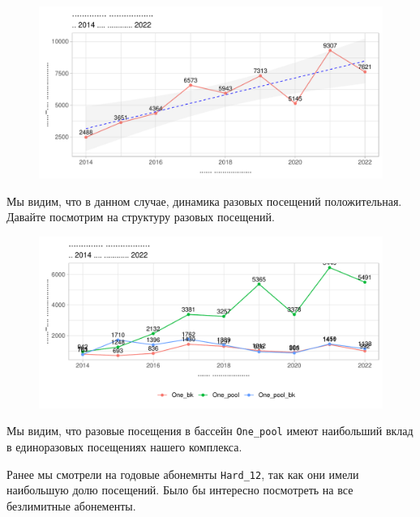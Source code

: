 \documentclass[
  letterpaper,
  DIV=11,
  numbers=noendperiod]{scrreprt}
\begin{document}
\begin{figure}

{\centering \includegraphics{./intro_files/figure-pdf/unnamed-chunk-12-1.pdf}

}

\end{figure}

Мы видим, что в данном случае, динамика разовых посещений положительная.
Давайте посмотрим на структуру разовых посещений.

\begin{figure}

{\centering \includegraphics{./intro_files/figure-pdf/unnamed-chunk-13-1.pdf}

}

\end{figure}

Мы видим, что разовые посещения в бассейн \texttt{One\_pool} имеют
наибольший вклад в единоразовых посещениях нашего комплекса.

Ранее мы смотрели на годовые абонемнты \texttt{Hard\_12}, так как они
имели наибольшую долю посещений. Было бы интересно посмотреть на все
безлимитные абонементы.
\end{document}
